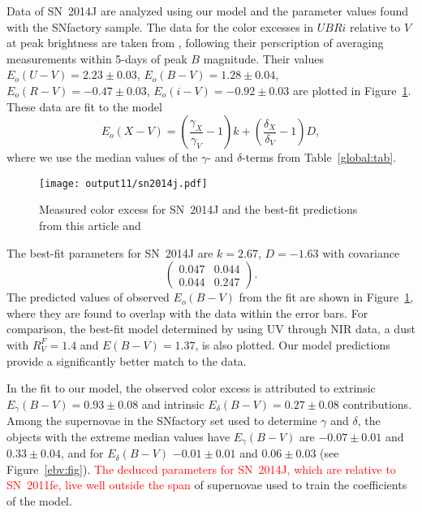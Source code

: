 \documentclass{aastex61}   	%
\begin{document}
Data of SN~2014J are  analyzed using our model and the parameter values found with the SNfactory sample.
The data for the color excesses  in $UBRi$  relative to $V$ at peak brightness  are taken from \citet{2014ApJ...788L..21A},
following their perscription of averaging measurements within 5-days of peak $B$ magnitude.
Their values 
$E_o(U-V) =   2.23 \pm   0.03$,
$E_o(B-V) =   1.28 \pm   0.04$,
$E_o(R-V) =  -0.47 \pm   0.03$,
$E_o(i-V) =  -0.92 \pm   0.03$
are plotted in Figure~\ref{sn2014j:fig}.
These data are fit to the model
\begin{equation}
E_o(X-V) =  \left(\frac{\gamma_X}{\gamma_V}-1\right)k +  \left(\frac{\delta_X}{\delta_V}-1\right)D,
\end{equation}
where we use the median values of the $\gamma$- and $\delta$-terms from Table~\ref{global:tab}.

\begin{figure}[htbp] %
   \centering
   \texttt{[image: output11/sn2014j.pdf]} 
   \caption{Measured color excess for SN~2014J and the best-fit predictions from this article and  \citet{2014ApJ...788L..21A}  
   \label{sn2014j:fig}}
\end{figure}

The best-fit parameters for SN~2014J are 
$k= 2.67$, $ D=-1.63$ with covariance
\begin{equation}
\begin{pmatrix}
0.047 & 0.044 \\
0.044 & 0.247
\end{pmatrix}.
\end{equation}
The predicted values of observed $E_o(B-V)$ from the fit are shown in Figure~\ref{sn2014j:fig}, where they are found to
overlap with the data within the error bars.   For comparison, the best-fit model determined by  \citet{2014ApJ...788L..21A} using
UV through NIR data,
a  \citet{1999PASP..111...63F} dust with $R_V^F=1.4$ and $E(B-V)=1.37$, 
is also plotted.  Our model predictions provide a significantly better match to the data.

In the fit to our model, the observed color excess is attributed to   extrinsic
$E_\gamma(B-V)=  0.93 \pm   0.08$ and intrinsic $E_\delta(B-V)=  0.27 \pm   0.08$
contributions.
Among the supernovae in the SNfactory  set used to determine $\gamma$ and $\delta$, the
\color{red}
objects with the extreme median values have 
$E_\gamma(B-V)$ are $-0.07 \pm 0.01$ and  $  0.33 \pm 0.04$,
and for $E_\delta(B-V)$ $-0.01 \pm 0.01$  and
$  0.06 \pm 0.03$ 
\color{black}
(see Figure~\ref{ebv:fig}).
\textcolor{red}{The deduced parameters for SN~2014J, which are relative to SN~2011fe, live well outside the 
span} of supernovae used to train the coefficients of the model.
\end{document}
